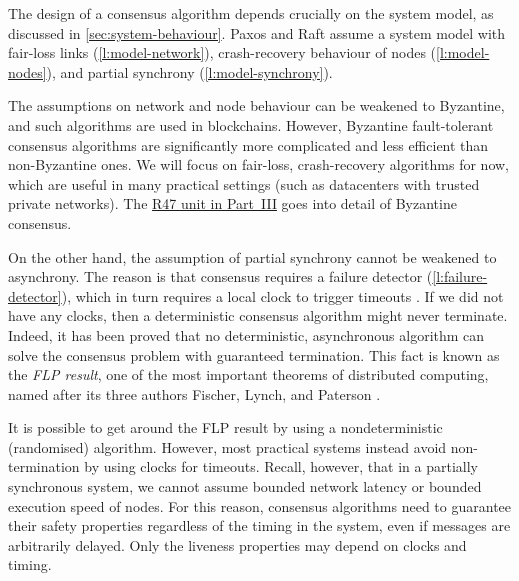 The design of a consensus algorithm depends crucially on the system model, as discussed in \autoref{sec:system-behaviour}.
Paxos and Raft assume a system model with fair-loss links (\autoref{l:model-network}), crash-recovery behaviour of nodes (\autoref{l:model-nodes}), and partial synchrony (\autoref{l:model-synchrony}).

The assumptions on network and node behaviour can be weakened to Byzantine, and such algorithms are used in blockchains.
However, Byzantine fault-tolerant consensus algorithms are significantly more complicated and less efficient than non-Byzantine ones.
We will focus on fair-loss, crash-recovery algorithms for now, which are useful in many practical settings (such as datacenters with trusted private networks).
The \href{\ledgersystems}{R47 unit in Part~III} goes into detail of Byzantine consensus.

On the other hand, the assumption of partial synchrony cannot be weakened to asynchrony.
The reason is that consensus requires a failure detector (\autoref{l:failure-detector}), which in turn requires a local clock to trigger timeouts \citep{Chandra:1996}.
If we did not have any clocks, then a deterministic consensus algorithm might never terminate.
Indeed, it has been proved that no deterministic, asynchronous algorithm can solve the consensus problem with guaranteed termination.
This fact is known as the \emph{FLP result}, one of the most important theorems of distributed computing, named after its three authors Fischer, Lynch, and Paterson \citep{Fischer:1985}.

It is possible to get around the FLP result by using a nondeterministic (randomised) algorithm.
However, most practical systems instead avoid non-termination by using clocks for timeouts.
Recall, however, that in a partially synchronous system, we cannot assume bounded network latency or bounded execution speed of nodes.
For this reason, consensus algorithms need to guarantee their safety properties regardless of the timing in the system, even if messages are arbitrarily delayed.
Only the liveness properties may depend on clocks and timing.

